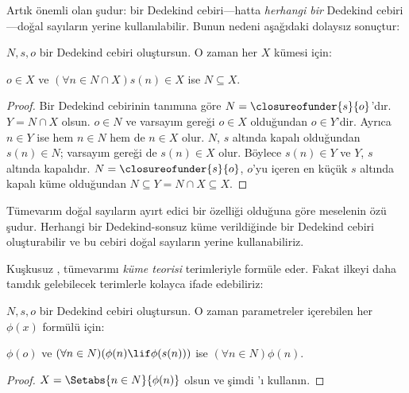 


Artık önemli olan şudur: bir Dedekind cebiri---hatta \emph{herhangi bir}
Dedekind cebiri---doğal sayıların yerine kullanılabilir. Bunun nedeni
aşağıdaki dolaysız sonuçtur:

\begin{thm}
$N,s,o$ bir Dedekind cebiri oluştursun. O zaman her $X$ kümesi için:
	\begin{center}
		$o \in X$ ve $(\forall {n} \in N \cap X){s}({n}) \in X$ ise
		$N \subseteq X$.
	\end{center}
\end{thm}

\begin{proof}
Bir Dedekind cebirinin tanımına göre $N=\closureofunder{s}{o}$'dır.
$Y=N\cap X$ olsun. $o\in N$ ve varsayım gereği $o\in X$ olduğundan
$o\in Y$'dir. Ayrıca $n\in Y$ ise hem $n\in N$ hem de $n\in X$ olur.
$N$, $s$ altında kapalı olduğundan $s(n)\in N$; varsayım gereği de
$s(n)\in X$ olur. Böylece $s(n)\in Y$ ve $Y$, $s$ altında kapalıdır.
$N=\closureofunder{s}{o}$, $o$'yu içeren en küçük $s$ altında kapalı küme
olduğundan $N\subseteq Y=N\cap X\subseteq X$.
\end{proof}

Tümevarım doğal sayıların ayırt edici bir özelliği olduğuna göre meselenin
özü şudur. Herhangi bir Dedekind-sonsuz küme verildiğinde bir Dedekind cebiri
oluşturabilir ve bu cebiri doğal sayıların yerine kullanabiliriz.

Kuşkusuz , tümevarımı \emph{küme teorisi}
terimleriyle formüle eder. Fakat ilkeyi daha tanıdık gelebilecek terimlerle
kolayca ifade edebiliriz:

\begin{cor}
$N,s,o$ bir Dedekind cebiri oluştursun. O zaman parametreler içerebilen her
$\phi(x)$ formülü için:
\begin{center}
	$\phi(o)$ ve $(\forall {n} \in N)(\phi(n)\lif
	\phi({s}({n})))$ ise $(\forall n \in N)\phi(n)$.
\end{center}
\end{cor}

\begin{proof}
$X=\Setabs{n\in N}{\phi(n)}$ olsun ve şimdi
'ı kullanın.
\end{proof}

